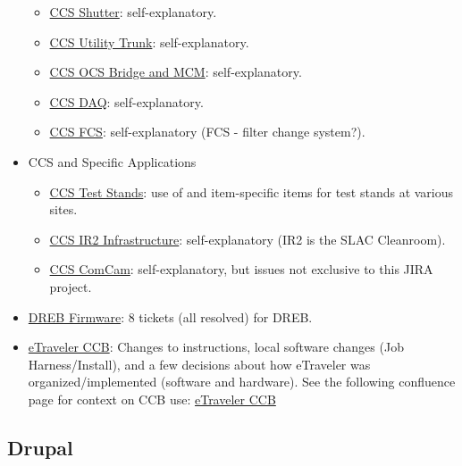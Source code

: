 \begin{itemize}
\begin{itemize}
		\item \href{https://jira.slac.stanford.edu/browse/LSSTCCSSHUTTER}{CCS Shutter}:  self-explanatory.
		\item \href{https://jira.slac.stanford.edu/browse/LSSTCCSUT}{CCS Utility Trunk}:  self-explanatory.
		\item \href{https://jira.slac.stanford.edu/browse/LCOBM}{CCS OCS Bridge and MCM}:  self-explanatory.
		\item \href{https://jira.slac.stanford.edu/browse/LSSTCCSDAQ}{CCS DAQ}:  self-explanatory.
		\item \href{https://jira.slac.stanford.edu/browse/LSSTCCSFCS}{CCS FCS}:  self-explanatory (FCS - filter change system?).	
	\end{itemize}
	\item CCS and Specific Applications
	\begin{itemize}
		\item \href{https://jira.slac.stanford.edu/browse/LSSTCCSTS}{CCS Test Stands}:  use of and item-specific items for test stands at various sites.
		\item \href{https://jira.slac.stanford.edu/browse/LSSTIR}{CCS IR2 Infrastructure}:  self-explanatory (IR2 is the SLAC Cleanroom).
		\item \href{https://jira.slac.stanford.edu/browse/LSSTCCSCOM}{CCS ComCam}:  self-explanatory, but issues not exclusive to this JIRA project.
	\end{itemize}
	\item \href{https://jira.slac.stanford.edu/browse/LSSTDREB}{DREB Firmware}:  8 tickets (all resolved) for DREB.
	\item \href{https://jira.slac.stanford.edu/browse/ETCCB}{eTraveler CCB}:  Changes to instructions, local software changes (Job Harness/Install), and a few decisions about how eTraveler was organized/implemented (software and hardware). See the following confluence page for context on CCB use: \href{https://confluence.slac.stanford.edu/display/LSSTCAM/eTraveler+CCB}{eTraveler CCB}
\end{itemize}

\subsection{Drupal}

